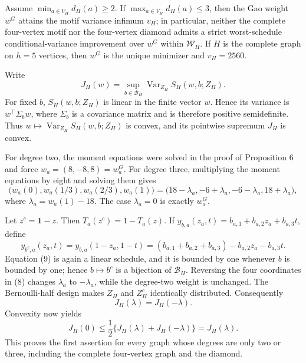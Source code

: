 Assume \(\min_{a\in V_H}d_H(a)\ge2\).  If \(\max_{a\in V_H}d_H(a)\le3\), then the Gao weight \(w^G\) attains the motif variance infimum \(v_H\); in particular, neither the complete four-vertex motif nor the four-vertex diamond admits a strict worst-schedule conditional-variance improvement over \(w^G\) within \(\mathcal W_H\).  If \(H\) is the complete graph on \(h=5\) vertices, then \(w^G\) is the unique minimizer and \(v_H=2560\).

Write
\[
J_H(w)=\sup_{b\in\mathcal B_H}\operatorname{Var}_{Z_H}S_H(w,b;Z_H).
\]
For fixed \(b\), \(S_H(w,b;Z_H)\) is linear in the finite vector \(w\).  Hence its variance is \(w^\top\Sigma_b w\), where \(\Sigma_b\) is a covariance matrix and is therefore positive semidefinite.  Thus \(w\mapsto\operatorname{Var}_{Z_H}S_H(w,b;Z_H)\) is convex, and its pointwise supremum \(J_H\) is convex.

For degree two, the moment equations were solved in the proof of Proposition 6 and force \(w_a=(8,-8,8)=w_a^G\).  For degree three, multiplying the moment equations by eight and solving them gives
\[
\bigl(w_a(0),w_a(1/3),w_a(2/3),w_a(1)\bigr)
=\bigl(18-\lambda_a,-6+\lambda_a,-6-\lambda_a,18+\lambda_a\bigr), \tag{8}
\]
where \(\lambda_a=w_a(1)-18\).  The case \(\lambda_a=0\) is exactly \(w_a^G\).

Let \(z^c=\mathbf1-z\).  Then \(T_a(z^c)=1-T_a(z)\).  If \(y_{b,a}(z_a,t)=b_{a,1}+b_{a,2}z_a+b_{a,3}t\), define
\[
y_{b^c,a}(z_a,t)=y_{b,a}(1-z_a,1-t)
=(b_{a,1}+b_{a,2}+b_{a,3})-b_{a,2}z_a-b_{a,3}t. \tag{9}
\]
Equation (9) is again a linear schedule, and it is bounded by one whenever \(b\) is bounded by one; hence \(b\mapsto b^c\) is a bijection of \(\mathcal B_H\).  Reversing the four coordinates in (8) changes \(\lambda_a\) to \(-\lambda_a\), while the degree-two weight is unchanged.  The Bernoulli-half design makes \(Z_H\) and \(Z_H^c\) identically distributed.  Consequently
\[
J_H(\lambda)=J_H(-\lambda).
\]
Convexity now yields
\[
J_H(0)\le\frac12\{J_H(\lambda)+J_H(-\lambda)\}=J_H(\lambda).
\]
This proves the first assertion for every graph whose degrees are only two or three, including the complete four-vertex graph and the diamond.

